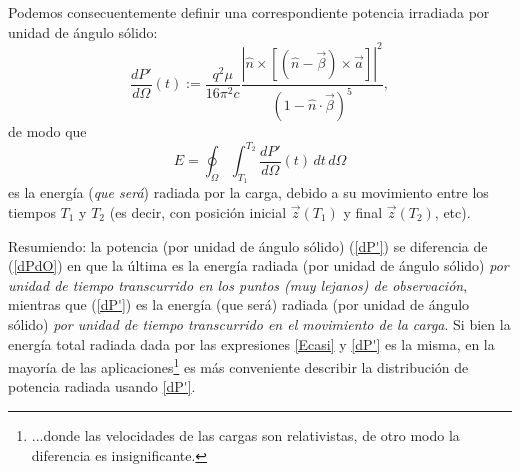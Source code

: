 Podemos consecuentemente definir una correspondiente potencia irradiada por unidad de ángulo sólido:
\begin{equation}
\boxed{\frac{dP'}{d\Omega}(t):=\frac{q^2\mu}{16\pi^2 c}\frac{\left|\hat{n}\times
\left[ \left( \hat{n}-\vec{\beta}\right)\times{\vec{a}}\right]\right|^2}{\left(
1-\hat{n}\cdot\vec{\beta}\right) ^{5}},} \label{dP'}
\end{equation}
de modo que
\begin{equation}
 \boxed{E=\oint_\Omega\int_{T_1}^{T_2}\frac{dP'}{d\Omega}(t)\,dt\,d\Omega}
\end{equation}
es la energía (\textit{que será}) radiada por la carga, debido a su movimiento entre los tiempos $T_1$ y $T_2$ (es decir, con posición inicial $\vec{z}(T_1)$ y final $\vec{z}(T_2)$, etc).

Resumiendo: la potencia (por unidad de ángulo sólido) (\ref{dP'}) se diferencia de (\ref{dPdO}) en que la última es la energía radiada (por unidad de ángulo sólido) \textit{por unidad de tiempo transcurrido en los puntos (muy lejanos) de observación}, mientras que (\ref{dP'}) es la energía (que será) radiada (por unidad de ángulo sólido) \textit{por unidad de tiempo transcurrido en el movimiento de la carga}. Si bien la energía total radiada dada por las expresiones \eqref{Ecasi} y \eqref{dP'} es la misma, en la mayoría de las aplicaciones\footnote{...donde las velocidades de las cargas son relativistas, de otro modo la diferencia es insignificante.} es más conveniente describir la distribución de potencia radiada usando \eqref{dP'}.

